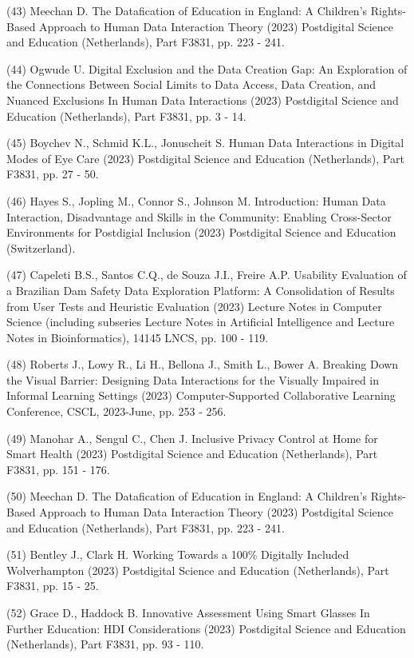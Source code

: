 \documentclass[
	12pt,				%
	oneside,			%
	a4paper,			%
	english,			%
	brazil				%
	]{abntex2ppgsi}
\begin{document}
\begin{apendicesenv}
(43) Meechan D. The Datafication of Education in England: A Children’s Rights-Based Approach to Human Data Interaction Theory (2023) Postdigital Science and Education (Netherlands), Part F3831, pp. 223 - 241.

(44) Ogwude U. Digital Exclusion and the Data Creation Gap: An Exploration of the Connections Between Social Limits to Data Access, Data Creation, and Nuanced Exclusions In Human Data Interactions (2023) Postdigital Science and Education (Netherlands), Part F3831, pp. 3 - 14.

(45) Boychev N., Schmid K.L., Jonuscheit S. Human Data Interactions in Digital Modes of Eye Care (2023) Postdigital Science and Education (Netherlands), Part F3831, pp. 27 - 50.

(46) Hayes S., Jopling M., Connor S., Johnson M. Introduction: Human Data Interaction, Disadvantage and Skills in the Community: Enabling Cross-Sector Environments for Postdigial Inclusion (2023) Postdigital Science and Education (Switzerland).

(47) Capeleti B.S., Santos C.Q., de Souza J.I., Freire A.P. Usability Evaluation of a Brazilian Dam Safety Data Exploration Platform: A Consolidation of Results from User Tests and Heuristic Evaluation (2023) Lecture Notes in Computer Science (including subseries Lecture Notes in Artificial Intelligence and Lecture Notes in Bioinformatics), 14145 LNCS, pp. 100 - 119.

(48) Roberts J., Lowy R., Li H., Bellona J., Smith L., Bower A. Breaking Down the Visual Barrier: Designing Data Interactions for the Visually Impaired in Informal Learning Settings (2023) Computer-Supported Collaborative Learning Conference, CSCL, 2023-June, pp. 253 - 256.

(49) Manohar A., Sengul C., Chen J. Inclusive Privacy Control at Home for Smart Health (2023) Postdigital Science and Education (Netherlands), Part F3831, pp. 151 - 176.

(50) Meechan D. The Datafication of Education in England: A Children’s Rights-Based Approach to Human Data Interaction Theory (2023) Postdigital Science and Education (Netherlands), Part F3831, pp. 223 - 241.

(51) Bentley J., Clark H. Working Towards a 100\% Digitally Included Wolverhampton (2023) Postdigital Science and Education (Netherlands), Part F3831, pp. 15 - 25.

(52) Grace D., Haddock B. Innovative Assessment Using Smart Glasses In Further Education: HDI Considerations (2023) Postdigital Science and Education (Netherlands), Part F3831, pp. 93 - 110.


\end{apendicesenv}
\end{document}
